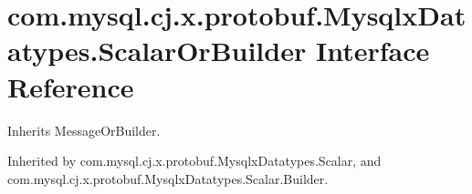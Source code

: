 \hypertarget{interfacecom_1_1mysql_1_1cj_1_1x_1_1protobuf_1_1_mysqlx_datatypes_1_1_scalar_or_builder}{}\section{com.\+mysql.\+cj.\+x.\+protobuf.\+Mysqlx\+Datatypes.\+Scalar\+Or\+Builder Interface Reference}
\label{interfacecom_1_1mysql_1_1cj_1_1x_1_1protobuf_1_1_mysqlx_datatypes_1_1_scalar_or_builder}


Inherits Message\+Or\+Builder.



Inherited by com.\+mysql.\+cj.\+x.\+protobuf.\+Mysqlx\+Datatypes.\+Scalar, and com.\+mysql.\+cj.\+x.\+protobuf.\+Mysqlx\+Datatypes.\+Scalar.\+Builder.

